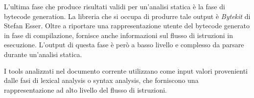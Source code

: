 L'ultima fase che produce risultati validi per un'analisi statica è la fase di bytecode generation. La libreria che si occupa di produrre tale output è \emph{Bytekit} di Stefan Esser. Oltre a riportare una rappresentazione utente del bytecode generato in fase di compilazione, fornisce anche informazioni sul flusso di istruzioni in esecuzione. L'output di questa fase è però a basso livello e complesso da parsare durante un'analisi statica.

I tools analizzati nel documento corrente utilizzano come input valori provenienti dalle fasi di lexical analysis o syntax analysis, che forniscono una rappresentazione ad alto livello del flusso di istruzioni.